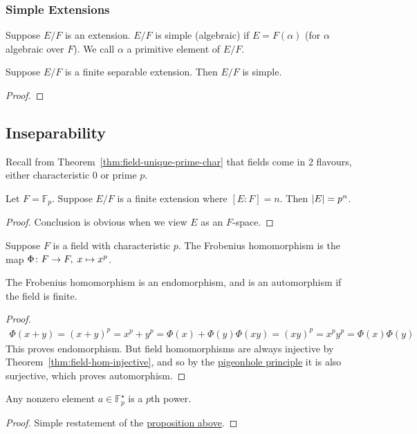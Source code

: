 \subsubsection*{Simple Extensions}

\begin{definition}
    Suppose \(E/F\) is an extension.
    \(E/F\) is simple (algebraic)
    if \(E = F(\alpha)\) (for \(\alpha\) algebraic over \(F\)).
    We call \(\alpha\) a primitive element of \(E/F\).
\end{definition}
\begin{theorem}
    Suppose \(E/F\) is a finite separable extension.
    Then \(E/F\) is simple.
\end{theorem}
\begin{proof}
\end{proof}


\subsection{Inseparability}

\begin{remark}
    Recall from Theorem~\ref{thm:field-unique-prime-char}
    that fields come in 2 flavours,
    either characteristic 0 or prime \(p\).
\end{remark}

\begin{proposition}
    Let \(F = \mathbb{F}_p\).
    Suppose \(E/F\) is a finite extension where \([E:F] = n\).
    Then \(\abs{E} = p^n\).
\end{proposition}
\begin{proof}
    Conclusion is obvious when we view \(E\) as an \(F\)-space.
\end{proof}

\begin{definition}
    Suppose \(F\) is a field with characteristic \(p\).
    The Frobenius homomorphism is the map \(\Phi\colon F\to F,\;x\mapsto x^p\).
\end{definition}
\begin{proposition}\label{prop:frobenius-hom}
    The Frobenius homomorphism is an endomorphism,
    and is an automorphism if the field is finite.
\end{proposition}
\begin{proof}
    \begin{gather*}
        \Phi(x+y) = {(x+y)}^p = x^p + y^p = \Phi(x) + \Phi(y)
        \Phi(xy) = {(xy)}^p = x^p y^p = \Phi(x)\Phi(y)
    \end{gather*}
    This proves endomorphism.
    But field homomorphisms are always injective
    by Theorem~\ref{thm:field-hom-injective},
    and so by the \hyperref[thm:pigeonhole]{pigeonhole principle}
    it is also surjective,
    which proves automorphism.
\end{proof}
\begin{corollary}
    Any nonzero element \(a \in \mathbb{F}_p^\star\) is a \(p\)th power.
\end{corollary}
\begin{proof}
    Simple restatement of the \hyperref[prop:frobenius-hom]{proposition above}.
\end{proof}

